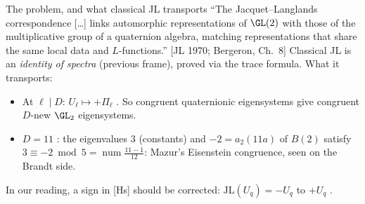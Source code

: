 \begin{frame}{The problem, and what classical JL transports}
  \small
  {\footnotesize ``The Jacquet--Langlands correspondence [\dots] links automorphic representations of $\GL(2)$ with those of the multiplicative
  group of a quaternion algebra, matching representations that share the same local data and $L$-functions.''
  \hfill[JL 1970; Bergeron, Ch.~8]}
  Classical JL is an \emph{identity of spectra} (previous frame), proved via the trace formula. What it transports:
  \begin{itemize}\setlength{\itemsep}{0pt}
    \item At $\ell\mid D$: $U_\ell\mapsto+\Pi_\ell$ .
      So congruent quaternionic eigensystems give congruent $D$-new $\GL_2$ eigensystems.
    \item $D=11$ : the eigenvalues $3$ (constants) and $-2=a_2(11a)$ of $B(2)$ satisfy
      $3\equiv-2\bmod5=\operatorname{num}\frac{11-1}{12}$: Mazur's Eisenstein congruence, seen on the Brandt side.
  \end{itemize}
  {\footnotesize In our reading, a sign in [Hs] should be corrected: $\mathrm{JL}(U_q)=-U_q$ to $+U_q$ .}
\end{frame}
